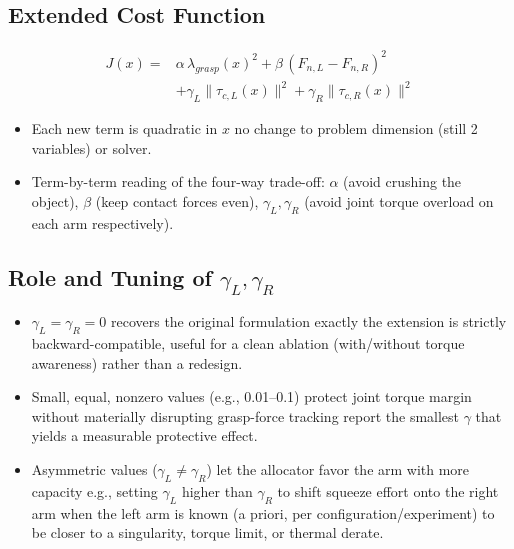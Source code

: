 \documentclass[conference]{IEEEtran}
\begin{document}
\subsection{Extended Cost Function}

    \begin{align}
    J(x) = & \alpha\,\lambda_{grasp}(x)^2
    + \beta\,(F_{n,L}-F_{n,R})^2 \\
    &+ \gamma_L\lVert\tau_{c,L}(x)\rVert^2
    + \gamma_R\lVert\tau_{c,R}(x)\rVert^2
    \end{align}
\begin{itemize}
    \item Each new term is quadratic in \(x\) no change to problem dimension (still 2 variables) or solver.

    \item Term-by-term reading of the four-way trade-off: 
    \(\alpha\) (avoid crushing the object), 
    \(\beta\) (keep contact forces even), 
    \(\gamma_L,\gamma_R\) (avoid joint torque overload on each arm respectively).
\end{itemize}


\subsection{Role and Tuning of $\gamma_L, \gamma_R$}
\begin{itemize}
    \item \(\gamma_L=\gamma_R=0\) recovers the original formulation exactly the extension is strictly backward-compatible, useful for a clean ablation (with/without torque awareness) rather than a redesign.

    \item Small, equal, nonzero values (e.g., 0.01--0.1) protect joint torque margin without materially disrupting grasp-force tracking report the smallest \(\gamma\) that yields a measurable protective effect.

    \item Asymmetric values (\(\gamma_L\neq\gamma_R\)) let the allocator favor the arm with more capacity e.g., setting \(\gamma_L\) higher than \(\gamma_R\) to shift squeeze effort onto the right arm when the left arm is known (a priori, per configuration/experiment) to be closer to a singularity, torque limit, or thermal derate.
\end{itemize}
\end{document}
